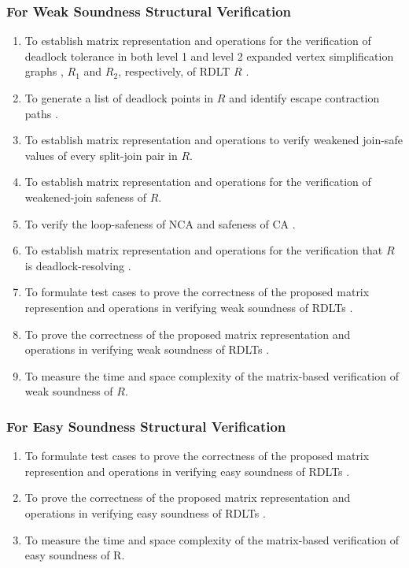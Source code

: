 \subsubsection*{For Weak Soundness Structural Verification}
\begin{enumerate}
    \item To establish matrix representation and operations for the verification of deadlock tolerance in both level 1 and level 2 expanded vertex simplification graphs \cite{MalinaoWCTP2023}, $R_1$ and $R_2$, respectively, of RDLT $R$ \cite{Malinao2017}.
    \item To generate a list of deadlock points in $R$ and identify escape contraction paths \cite{Ramirez2024} \cite{MalinaoPJS2023}.
    \item To establish matrix representation and operations to verify weakened join-safe values of every split-join \cite{Ramirez2024} pair in $R$.
    \item To establish matrix representation and operations for the verification of weakened-join safeness \cite{Ramirez2024} of $R$.
    \item To verify the loop-safeness of NCA and safeness of CA \cite{MalinaoPJS2023}.
    \item To establish matrix representation and operations for the verification that $R$ is deadlock-resolving \cite{Ramirez2024}.
    \item To formulate test cases to prove the correctness of the proposed matrix represention and operations in verifying weak soundness of RDLTs \cite{Ramirez2024}.
    \item To prove the correctness of the proposed matrix representation and operations in verifying weak soundness of RDLTs \cite{Ramirez2024}.
    \item To measure the time and space complexity of the matrix-based verification of weak soundness of $R$.
\end{enumerate}
\subsubsection*{For Easy Soundness Structural Verification}
\begin{enumerate}
    \item To formulate test cases to prove the correctness of the proposed matrix represention and operations in verifying easy soundness of RDLTs \cite{Ramirez2024}.
    \item To prove the correctness of the proposed matrix representation and operations in verifying easy soundness of RDLTs \cite{Ramirez2024}.
    \item To measure the time and space complexity of the matrix-based verification of easy soundness of R.
\end{enumerate}
